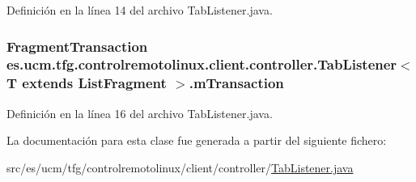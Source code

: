 Definición en la línea 14 del archivo Tab\-Listener.\-java.

\hypertarget{classes_1_1ucm_1_1tfg_1_1controlremotolinux_1_1client_1_1controller_1_1TabListener_3_01T_01extends_01ListFragment_01_4_a155f87ca0c2004ce5fcbdc094adc0c05}{
\subsubsection[{m\-Transaction}]{\setlength{\rightskip}{0pt plus 5cm}Fragment\-Transaction es.\-ucm.\-tfg.\-controlremotolinux.\-client.\-controller.\-Tab\-Listener$<$ T extends List\-Fragment $>$.m\-Transaction\hspace{0.3cm}{\ttfamily [private]}}}\label{classes_1_1ucm_1_1tfg_1_1controlremotolinux_1_1client_1_1controller_1_1TabListener_3_01T_01extends_01ListFragment_01_4_a155f87ca0c2004ce5fcbdc094adc0c05}


Definición en la línea 16 del archivo Tab\-Listener.\-java.



La documentación para esta clase fue generada a partir del siguiente fichero\-:\begin{DoxyCompactItemize}
\item 
src/es/ucm/tfg/controlremotolinux/client/controller/\hyperlink{TabListener_8java}{Tab\-Listener.\-java}\end{DoxyCompactItemize}
